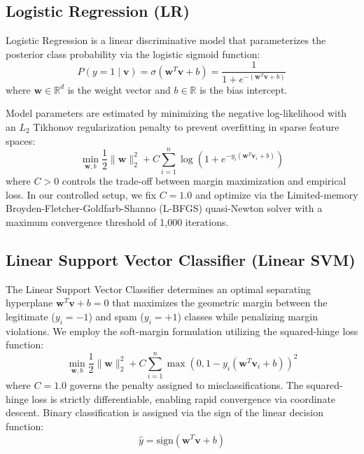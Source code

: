 \documentclass[conference]{IEEEtran}
\begin{document}
\subsection{Logistic Regression (LR)}
Logistic Regression is a linear discriminative model that parameterizes the posterior class probability via the logistic sigmoid function:
\begin{equation}
P(y = 1 \mid \mathbf{v}) = \sigma(\mathbf{w}^T \mathbf{v} + b) = \frac{1}{1 + e^{-(\mathbf{w}^T \mathbf{v} + b)}}
\end{equation}
where $\mathbf{w} \in \mathbb{R}^d$ is the weight vector and $b \in \mathbb{R}$ is the bias intercept.

Model parameters are estimated by minimizing the negative log-likelihood with an $L_2$ Tikhonov regularization penalty to prevent overfitting in sparse feature spaces:
\begin{equation}
\min_{\mathbf{w}, b} \frac{1}{2} \|\mathbf{w}\|_2^2 + C \sum_{i=1}^{n} \log \left( 1 + e^{-y_i (\mathbf{w}^T \mathbf{v}_i + b)} \right)
\end{equation}
where $C > 0$ controls the trade-off between margin maximization and empirical loss. In our controlled setup, we fix $C = 1.0$ and optimize via the Limited-memory Broyden-Fletcher-Goldfarb-Shanno (L-BFGS) quasi-Newton solver with a maximum convergence threshold of 1,000 iterations.

\subsection{Linear Support Vector Classifier (Linear SVM)}
The Linear Support Vector Classifier determines an optimal separating hyperplane $\mathbf{w}^T \mathbf{v} + b = 0$ that maximizes the geometric margin between the legitimate ($y_i = -1$) and spam ($y_i = +1$) classes while penalizing margin violations. We employ the soft-margin formulation utilizing the squared-hinge loss function:
\begin{equation}
\min_{\mathbf{w}, b} \frac{1}{2} \|\mathbf{w}\|_2^2 + C \sum_{i=1}^{n} \max \left( 0, 1 - y_i (\mathbf{w}^T \mathbf{v}_i + b) \right)^2
\end{equation}
where $C = 1.0$ governs the penalty assigned to misclassifications. The squared-hinge loss is strictly differentiable, enabling rapid convergence via coordinate descent. Binary classification is assigned via the sign of the linear decision function:
\begin{equation}
\hat{y} = \text{sign}(\mathbf{w}^T \mathbf{v} + b)
\end{equation}
\end{document}
